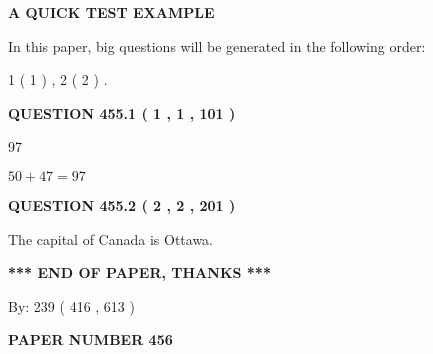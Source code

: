 \documentclass[12pt]{article}
\begin{document}
   
 \vspace{0.2in}
{\LARGE {\textbf{ A QUICK TEST EXAMPLE}}}
   
   
   
\vspace{0.2in}
   
In this paper, big questions will be generated in the following order: 
   
   
   1 ( 1 )
 ,
   2 ( 2 )
 .
  
\vspace{0.2in}
  
{\textbf{\Large{QUESTION
455.1 
 ( 1 , 1 , 101 )
}}}
  
  
 
 
\noindent{}

97
 
 
 
 
\noindent{}

$ %
50 +  %
47=   %
97$
 
 
  
\vspace{0.2in}
  
{\textbf{\Large{QUESTION
455.2 
 ( 2 , 2 , 201 )
}}}
  
  
 
 
\noindent{}
 
 
The capital of Canada is Ottawa.
 
 
 
 
   
   
 \vspace{0.2in}
 
   
   
   
   
\vspace{1.0in} 
{\textbf{\large{ *** END OF PAPER, THANKS *** }}} 
   
   
\hspace{1.0in} By: 
 239 ( 416 ,  613 )
   
   
   
   
\newpage 
\setcounter{page}{ 
   456001 } 
   
   
   
   
 {\textbf{ \Large{ PAPER NUMBER  456  }}}
   
   
\vspace{0.2in}
   
\end{document}
